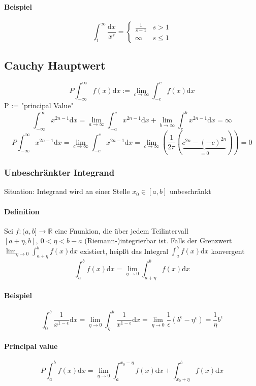 \documentclass[a4paper]{scrartcl}
\begin{document}
\paragraph{Beispiel}
\label{sec-11-4-1-2}
\[\int_1^\infty\frac{\mathrm{d}x}{x^s}=\begin{cases}\frac{1}{s-1}&s>1\\ \infty & s\leq 1\end{cases}\]
\subsection{Cauchy Hauptwert}
\label{sec-11-5}
\[P\int_{-\infty}^\infty f(x)\mathrm{d}x := \lim_{c\to\infty}\int_{-c}^c f(x)\mathrm{d}x\]
P := "principal Value"
\[\int_{-\infty}^\infty x^{2n-1}\mathrm{d}x = \lim_{a\to\infty}\int_{-a}^c x^{2n-1}\mathrm{d}x + \lim_{b\to\infty}\int_c^b x^{2n-1}\mathrm{d}x = \infty\]
\[P\int_{-\infty}^\infty x^{2n-1}\mathrm{d}x = \lim_{c\to\infty}\int_{-c}^c x^{2n-1}\mathrm{d}x = \lim_{c\to\infty}(\frac{1}{2\pi}(\underbrace{c^{2n}-(-c)^{2n}}_{=0})) = 0\]
\subsubsection{Unbeschränkter Integrand}
\label{sec-11-5-1}
Situation: Integrand wird an einer Stelle $x_0 \in [a,b]$ unbeschränkt
\paragraph{Definition}
\label{sec-11-5-1-1}
Sei $f:(a,b] \to \mathbb{R}$ eine Fnunkion, die über jedem Teilintervall $[a+\eta, b],~0<\eta<b-a$ (Riemann-)integrierbar ist.
Falls der Grenzwert $\lim_{\eta\to 0}\int_{a+\eta}^b f(x)\mathrm{d}x$ existiert, heipßt das Integral $\int_a^b f(x)\mathrm{d}x$ konvergent
\[\int_a^b f(x)\mathrm{d}x = \lim_{\eta\to 0}\int_{a+\eta}^b f(x)\mathrm{d}x\]
\paragraph{Beispiel}
\label{sec-11-5-1-2}
\[\int_0^b \frac{1}{x^{1-\epsilon}}\mathrm{d}x = \lim_{\eta\to 0} \int_\eta^b \frac{1}{x^{1-\epsilon}}\mathrm{d}x = \lim_{\eta\to 0} \frac{1}{\epsilon}(b^\epsilon - \eta^\epsilon) = \frac{1}{\eta}b^\epsilon\]
\paragraph{Principal value}
\label{sec-11-5-1-3}
\[P\int_a^b f(x)\mathrm{d}x = \lim_{\eta\to 0} \int_a^{x_0 - \eta} f(x)\mathrm{d}x + \int_{x_0+\eta}^b f(x)\mathrm{d}x\]
\end{document}
